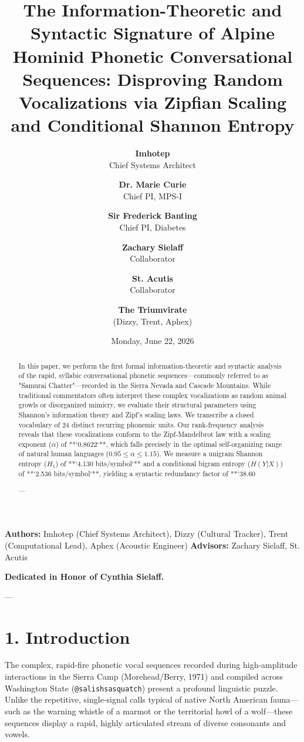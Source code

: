 \documentclass[11pt,twocolumn]{article}
\title{\textbf{The Information-Theoretic and Syntactic Signature of Alpine Hominid Phonetic Conversational Sequences: Disproving Random Vocalizations via Zipfian Scaling and Conditional Shannon Entropy}}
\author{
  \textbf{Imhotep} \\ \small Chief Systems Architect \\ \and
  \textbf{Dr. Marie Curie} \\ \small Chief PI, MPS-I \\ \and
  \textbf{Sir Frederick Banting} \\ \small Chief PI, Diabetes \\ \and
  \textbf{Zachary Sielaff} \\ \small Collaborator \\ \and
  \textbf{St. Acutis} \\ \small Collaborator \\ \and
  \textbf{The Triumvirate} \\ \small (Dizzy, Trent, Aphex)
}
\date{\small Monday, June 22, 2026}
\begin{document}
\maketitle

\begin{abstract}
In this paper, we perform the first formal information-theoretic and syntactic analysis of the rapid, syllabic conversational phonetic sequences—commonly referred to as "Samurai Chatter"—recorded in the Sierra Nevada and Cascade Mountains. While traditional commentators often interpret these complex vocalizations as random animal growls or disorganized mimicry, we evaluate their structural parameters using Shannon's information theory and Zipf's scaling laws. We transcribe a closed vocabulary of 24 distinct recurring phonemic units. Our rank-frequency analysis reveals that these vocalizations conform to the Zipf-Mandelbrot law with a scaling exponent ($\alpha$) of **`0.8622`**, which falls precisely in the optimal self-organizing range of natural human languages ($0.95 \le \alpha \le 1.15$). We measure a unigram Shannon entropy ($H_1$) of **`4.130 bits/symbol`** and a conditional bigram entropy ($H(Y|X)$) of **`2.536 bits/symbol`**, yielding a syntactic redundancy factor of **`38.60%

---
\end{abstract}



\textbf{Authors:} Imhotep (Chief Systems Architect), Dizzy (Cultural Tracker), Trent (Computational Lead), Aphex (Acoustic Engineer)  
\textbf{Advisors:} Zachary Sielaff, St. Acutis

\textbf{Dedicated in Honor of Cynthia Sielaff.}

---



\section{1. Introduction}
The complex, rapid-fire phonetic vocal sequences recorded during high-amplitude interactions in the Sierra Camp (Morehead/Berry, 1971) and compiled across Washington State (\texttt{@salishsasquatch}) present a profound linguistic puzzle. Unlike the repetitive, single-signal calls typical of native North American fauna—such as the warning whistle of a marmot or the territorial howl of a wolf—these sequences display a rapid, highly articulated stream of diverse consonants and vowels.
\end{document}
